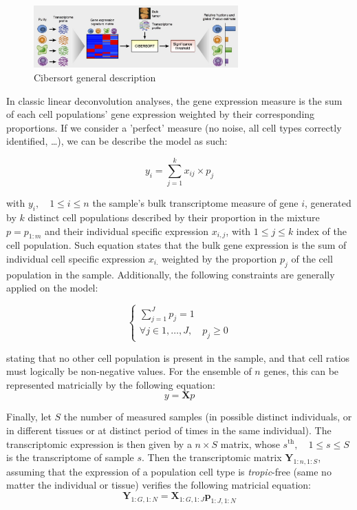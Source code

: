 \begin{figure}
\centering
\includegraphics[width=0.7\textwidth]{figures/deconvolution_general_process.jpg}
\caption{Cibersort general description}
\label{fig:cibersort-pipeline}
\end{figure}


In classic linear deconvolution analyses, the gene expression measure is
the sum of each cell populations' gene expression weighted by their
corresponding proportions. If we consider a 'perfect' measure (no noise,
all cell types correctly identified, \ldots), we can be describe the
model as such:

\[
y_i = \sum_{j=1}^k x_{ij} \times p_j
\] 

with \(y_i, \quad 1 \le i \le n\) the sample's bulk transcriptome measure of gene \(i\), generated by \(k\) distinct cell populations
described by their proportion in the mixture \(p=p_{1:m}\) and their
individual specific expression \(x_{i, j}\), with \(1 \le j \le k\)
index of the cell population. Such equation states that the bulk gene
expression is the sum of individual cell specific expression \(x_{i.}\)
weighted by the proportion \(p_j\) of the cell population in the sample.
Additionally, the following constraints are generally applied on the model: 

\begin{equation}
\begin{cases}
\sum_{j=1}^J p_j=1\\
\forall j \in 1, \ldots, J, \quad p_j\ge 0
\end{cases}
\label{eq:simplex-constraint}
\end{equation}

 stating that no other cell population is present in the sample, and
that cell ratios must logically be non-negative values. For the ensemble
of \(n\) genes, this can be represented matricially by the following
equation: 
\[
y=\mathbf{X}p
\] 

Finally, let \(S\) the number of measured samples (in possible
distinct individuals, or in different tissues or at distinct period of
times in the same individual). The transcriptomic expression is then
given by a \(n \times S\) matrix, whose
\(s^{\text{th}}, \quad 1 \le s \le S\) is the transcriptome of sample
\(s\). Then the transcriptomic matrix \(\mathbf{Y}_{1:n, 1:S}\),
assuming that the expression of a population cell type is
\emph{tropic}-free (same no matter the individual or tissue) verifies
the following matricial equation: \[
\mathbf{Y}_{1:G, 1:N}=\boldsymbol{X}_{1:G, 1:J} \mathbf{p}_{1:J, 1:N}
\]

